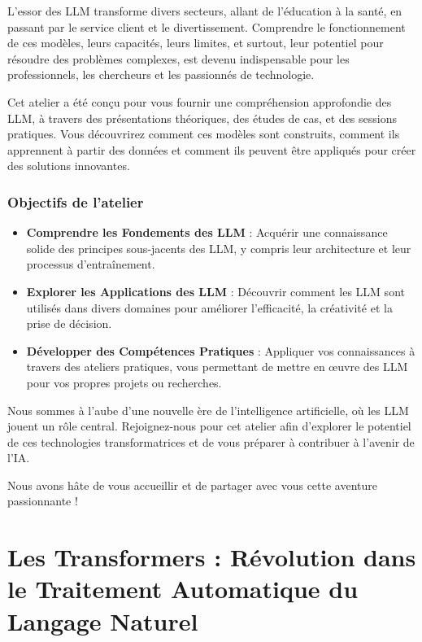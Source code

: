 \documentclass[
  letterpaper,
  DIV=11,
  numbers=noendperiod]{scrreprt}
\providecommand{\tightlist}{%
  \setlength{\itemsep}{0pt}\setlength{\parskip}{0pt}}\usepackage{longtable,booktabs,array}
\begin{document}

L'essor des LLM transforme divers secteurs, allant de l'éducation à la
santé, en passant par le service client et le divertissement. Comprendre
le fonctionnement de ces modèles, leurs capacités, leurs limites, et
surtout, leur potentiel pour résoudre des problèmes complexes, est
devenu indispensable pour les professionnels, les chercheurs et les
passionnés de technologie.

Cet atelier a été conçu pour vous fournir une compréhension approfondie
des LLM, à travers des présentations théoriques, des études de cas, et
des sessions pratiques. Vous découvrirez comment ces modèles sont
construits, comment ils apprennent à partir des données et comment ils
peuvent être appliqués pour créer des solutions innovantes.

\subsection*{Objectifs de l'atelier}\label{objectifs-de-latelier}

\begin{itemize}
\tightlist
\item
  \textbf{Comprendre les Fondements des LLM} : Acquérir une connaissance
  solide des principes sous-jacents des LLM, y compris leur architecture
  et leur processus d'entraînement.
\item
  \textbf{Explorer les Applications des LLM} : Découvrir comment les LLM
  sont utilisés dans divers domaines pour améliorer l'efficacité, la
  créativité et la prise de décision.
\item
  \textbf{Développer des Compétences Pratiques} : Appliquer vos
  connaissances à travers des ateliers pratiques, vous permettant de
  mettre en œuvre des LLM pour vos propres projets ou recherches.
\end{itemize}

Nous sommes à l'aube d'une nouvelle ère de l'intelligence artificielle,
où les LLM jouent un rôle central. Rejoignez-nous pour cet atelier afin
d'explorer le potentiel de ces technologies transformatrices et de vous
préparer à contribuer à l'avenir de l'IA.

Nous avons hâte de vous accueillir et de partager avec vous cette
aventure passionnante !


\chapter{Les Transformers : Révolution dans le Traitement Automatique du
Langage
Naturel}\label{les-transformers-ruxe9volution-dans-le-traitement-automatique-du-langage-naturel}
\end{document}
